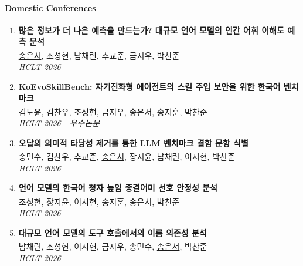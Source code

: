 \documentclass[10pt,a4paper]{article}
\begin{document}
\paragraph{Domestic Conferences}
\begin{enumerate}
    \item \small{\textbf{많은 정보가 더 나은 예측을 만드는가? 대규모 언어 모델의 인간 어휘 이해도 예측 분석} \\
    \underline{송은서}, 조성현, 남채린, 추교준, 금지우, 박찬준\textsuperscript{\textdagger} \\
    \textit{HCLT 2026}} \vspace{0.4em}

    \item \small{\textbf{KoEvoSkillBench: 자기진화형 에이전트의 스킬 주입 보안을 위한 한국어 벤치마크} \\
    김도윤, 김찬우, 조성현, 금지우, \underline{송은서}, 송지훈, 박찬준\textsuperscript{\textdagger} \\
    \textit{HCLT 2026 - 우수논문}} \vspace{0.4em}

    \item \small{\textbf{오답의 의미적 타당성 제거를 통한 LLM 벤치마크 결함 문항 식별} \\
    송민수, 김찬우, 추교준, \underline{송은서}, 장지윤, 남채린, 이시현, 박찬준\textsuperscript{\textdagger} \\
    \textit{HCLT 2026}} \vspace{0.4em}

    \item \small{\textbf{언어 모델의 한국어 청자 높임 종결어미 선호 안정성 분석} \\
    조성현, 장지윤, 이시현, 송지훈, \underline{송은서}, 박찬준\textsuperscript{\textdagger} \\
    \textit{HCLT 2026}} \vspace{0.4em}

    \item \small{\textbf{대규모 언어 모델의 도구 호출에서의 이름 의존성 분석} \\
    남채린, 조성현, 이시현, 금지우, 송민수, \underline{송은서}, 박찬준\textsuperscript{\textdagger} \\
    \textit{HCLT 2026}}
\end{enumerate}
\end{document}

